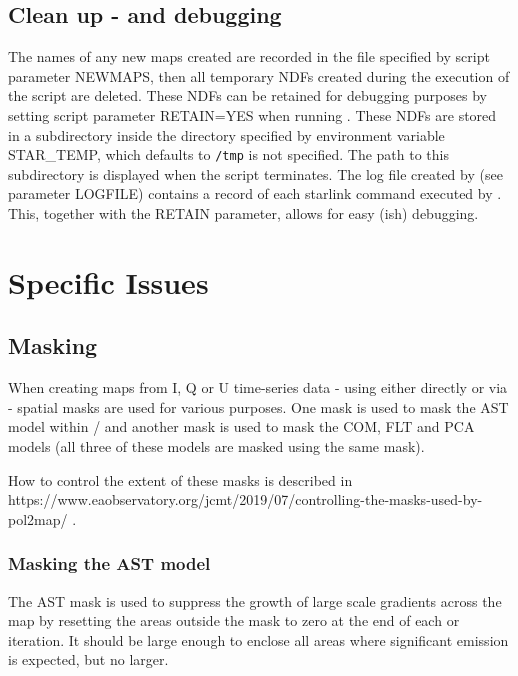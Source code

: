 \documentclass[twoside,11pt]{starlink}
\begin{document}
\subsection{Clean up - and debugging}
The names of any new maps created are recorded in the file specified by
script parameter NEWMAPS, then all temporary NDFs created during the
execution of the script are deleted. These NDFs can be retained for
debugging purposes by setting script parameter RETAIN=YES when running
\ptmap. These NDFs are stored in a subdirectory inside the
directory specified by environment variable STAR\_TEMP, which defaults to
\texttt{/tmp} is not specified. The path to this subdirectory is displayed when
the script terminates. The log file created by \ptmap (see
parameter LOGFILE) contains a record of each starlink command executed by
\ptmap. This, together with the RETAIN parameter, allows for
easy (ish) debugging.

\section{Specific Issues}
\subsection{Masking}

When creating maps from I, Q or U time-series data - using either
\mmap directly or via \sloop - spatial masks are used for
various purposes. One mask is used to mask the AST model within
\mmap / \sloop and another mask is used to mask the COM, FLT and PCA
models (all three of these models are masked using the same mask).

How to control the extent of these masks is described in
{https://www.eaobservatory.org/jcmt/2019/07/controlling-the-masks-used-by-pol2map/}
.


\subsubsection{Masking the AST model}
The AST mask is used to suppress the growth of large scale gradients across
the map by resetting the areas outside the mask to zero at the end of
each \mmap or \sloop iteration. It should be large enough to enclose all
areas where significant emission is expected, but no larger.
\end{document}
